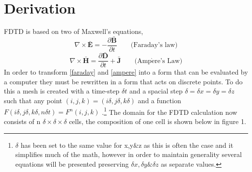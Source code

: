 \documentclass[twocolumn]{article}
\begin{document}
\section{Derivation}
FDTD is based on two of Maxwell's equations,
\begin{equation} \label{faraday}
\nabla\times\mathbf{\bar{E}}=-\frac{\partial\mathbf{\bar{B}}}{\partial t}\qquad \text{(Faraday's law)}
\end{equation}
\begin{equation} \label{ampere}
\nabla\times\mathbf{\bar{H}}=\frac{\partial\mathbf{\bar{D}}}{\partial t}+\bar{\mathbf{J}}
\qquad \text{(Amp}\grave{\mathrm{e}}\text{re's Law)}
\end{equation}
In order to transform \eqref{faraday} and \eqref{ampere} into a form that can be evaluated by a
computer they must be rewritten in a form that acts on discrete points. To do this a mesh is created
with a time-step $\delta{t}$ and a spacial step $\delta=\delta{x}=\delta{y}=\delta{z}$ such that any
point $(i,j,k)=(i\delta,j\delta,k\delta)$ and a function $F(i\delta,j\delta,k\delta,n\delta
{t})=F^n(i,j,k)$ \cite{yee66}.\footnote{$\delta$ has been set to the same value for x,y\&z as this
  is often the case and it simplifies much of the math, however in order to maintain generality
  several equations will be presented preserving $\delta{x},\delta{y}\&\delta{z}$ as separate
  values.} The domain for the FDTD calculation now consists of n $\delta\times\delta\times\delta$
cells, the composition of one cell is shown below in figure 1.
\end{document}
